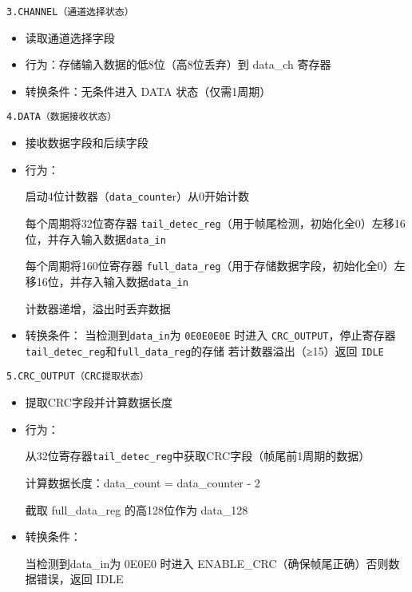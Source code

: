 \documentclass[12pt,]{article}
\begin{document}
\texttt{3.\hspace{0pt}CHANNEL\hspace{0pt}（通道选择状态）}

\begin{itemize}
\item
  读取通道选择字段
\item
  行为：存储输入数据的低8位（高8位丢弃）到 data\_ch 寄存器
\item
  转换条件：无条件进入 DATA 状态（仅需1周期）
\end{itemize}

\texttt{4.\hspace{0pt}DATA\hspace{0pt}（数据接收状态）}

\begin{itemize}
\item
  接收数据字段和后续字段
\item
  行为：

  启动4位计数器（\texttt{data\_counte}r）从0开始计数

  每个周期将32位寄存器
  \texttt{tail\_detec\_reg}（用于帧尾检测，初始化全0）左移16位，并存入输入数据\texttt{data\_in}

  每个周期将160位寄存器
  \texttt{full\_data\_reg}（用于存储数据字段，初始化全0）左移16位，并存入输入数据\texttt{data\_in}

  计数器递增，溢出时丢弃数据
\item
  转换条件： 当检测到\texttt{data\_in}为 \texttt{0E0E0E0E} 时进入
  \texttt{CRC\_OUTPUT}，停止寄存器\texttt{tail\_detec\_reg}和\texttt{full\_data\_reg}的存储
  若计数器溢出（≥15）返回 \texttt{IDLE}
\end{itemize}

\texttt{5.\hspace{0pt}CRC\_OUTPUT\hspace{0pt}（CRC提取状态）}

\begin{itemize}
\item
  提取CRC字段并计算数据长度
\item
  行为：

  从32位寄存器\texttt{tail\_detec\_reg}中获取CRC字段（帧尾前1周期的数据）

  计算数据长度：data\_count = data\_counter - 2

  截取 full\_data\_reg 的高128位作为 data\_128
\item
  转换条件：

  当检测到data\_in为 0E0E0 时进入
  ENABLE\_CRC（确保帧尾正确）否则数据错误，返回 IDLE
\end{itemize}
\end{document}
